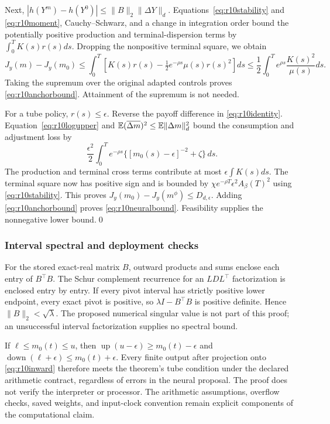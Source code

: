 Next, $|h(Y^m)-h(Y^0)|\leq\|B\|_2\|\Delta Y\|_d$. Equations~\eqref{eq:r10stability} and \eqref{eq:r10moment}, Cauchy--Schwarz, and a change in integration order bound the potentially positive production and terminal-dispersion terms by $\int_0^T K(s)r(s)ds$. Dropping the nonpositive terminal square, we obtain
\[
 J_y(m)-J_y(m_0)
 \leq\int_0^T\left[K(s)r(s)
             -\tfrac12e^{-\rho s}\mu(s)r(s)^2\right]ds
 \leq\frac12\int_0^T e^{\rho s}\frac{K(s)^2}{\mu(s)}ds.
\]
Taking the supremum over the original adapted controls proves \eqref{eq:r10anchorbound}. Attainment of the supremum is not needed.

For a tube policy, $r(s)\leq\epsilon$. Reverse the payoff difference in \eqref{eq:r10identity}. Equation~\eqref{eq:r10logupper} and
$\mathbb E(\overline{\Delta m})^2\leq\mathbb E\|\Delta m\|_d^2$
bound the consumption and adjustment loss by
\[
 \frac{\epsilon^2}{2}\int_0^T e^{-\rho s}
       \{[m_0(s)-\epsilon]^{-2}+\zeta\}\,ds.
\]
The production and terminal cross terms contribute at most $\epsilon\int K(s)ds$. The terminal square now has positive sign and is bounded by
$\chi e^{-\rho T}\epsilon^2 A_\beta(T)^2$ using \eqref{eq:r10stability}. This proves $J_y(m_0)-J_y(m^\phi)\leq D_{d,\epsilon}$. Adding \eqref{eq:r10anchorbound} proves \eqref{eq:r10neuralbound}. Feasibility supplies the nonnegative lower bound.\qed

\subsubsection{Interval spectral and deployment checks}
For the stored exact-real matrix $B$, outward products and sums enclose each entry of $B^\top B$. The Schur complement recurrence for an $LDL^\top$ factorization is enclosed entry by entry. If every pivot interval has strictly positive lower endpoint, every exact pivot is positive, so $\lambda I-B^\top B$ is positive definite. Hence $\|B\|_2<\sqrt\lambda$. The proposed numerical singular value is not part of this proof; an unsuccessful interval factorization supplies no spectral bound.

If $\ell\leq m_0(t)\leq u$, then
$\operatorname{up}(u-\epsilon)\geq m_0(t)-\epsilon$ and
$\operatorname{down}(\ell+\epsilon)\leq m_0(t)+\epsilon$.
Every finite output after projection onto \eqref{eq:r10inward} therefore meets the theorem's tube condition under the declared arithmetic contract, regardless of errors in the neural proposal. The proof does not verify the interpreter or processor. The arithmetic assumptions, overflow checks, saved weights, and input-clock convention remain explicit components of the computational claim.
